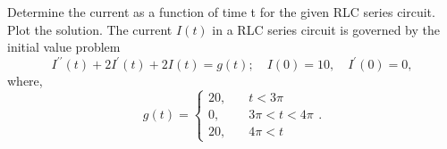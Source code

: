 \documentclass[11pt]{article}
\begin{document}
\begin{problem}
Determine the current as a function of time t for the given RLC series circuit. Plot the solution. The current $I(t)$ in a RLC series circuit is governed by the initial value problem
\begin{equation*}
I^{\prime \prime}(t)+2I^{\prime}(t) +2I(t)=g(t); \quad I(0)=10, \quad I^{\prime}(0) = 0,
\end{equation*}
where,
\begin{equation*}
g(t) = \begin{cases} 
20, &\quad t<3\pi \\
0, &\quad 3\pi<t<4\pi \\
20, &\quad 4\pi<t
\end{cases}.
\end{equation*}
\end{problem}
\end{document}
